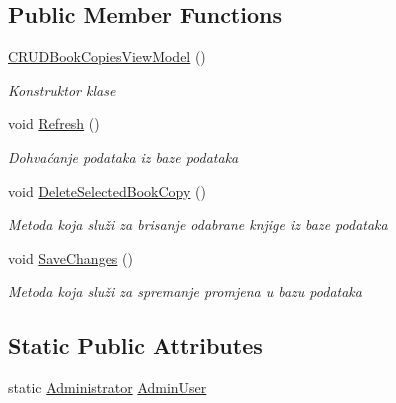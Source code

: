 \subsection*{Public Member Functions}
\begin{DoxyCompactItemize}
\item 
\mbox{\hyperlink{class_easy_library_application_1_1_w_p_f_1_1_view_model_1_1_c_r_u_d_book_copies_view_model_af97e6875ac18af67f3bf1a0243eceb86}{C\+R\+U\+D\+Book\+Copies\+View\+Model}} ()
\begin{DoxyCompactList}\small\item\em Konstruktor klase \end{DoxyCompactList}\item 
void \mbox{\hyperlink{class_easy_library_application_1_1_w_p_f_1_1_view_model_1_1_c_r_u_d_book_copies_view_model_ab1cf39d53fdb4af4a4ddd13f14a15278}{Refresh}} ()
\begin{DoxyCompactList}\small\item\em Dohvaćanje podataka iz baze podataka \end{DoxyCompactList}\item 
void \mbox{\hyperlink{class_easy_library_application_1_1_w_p_f_1_1_view_model_1_1_c_r_u_d_book_copies_view_model_a581924316d117e39c1a53b36e7a61290}{Delete\+Selected\+Book\+Copy}} ()
\begin{DoxyCompactList}\small\item\em Metoda koja služi za brisanje odabrane knjige iz baze podataka \end{DoxyCompactList}\item 
void \mbox{\hyperlink{class_easy_library_application_1_1_w_p_f_1_1_view_model_1_1_c_r_u_d_book_copies_view_model_a28e88009ab1d5f3c5dfd35a623b4a76a}{Save\+Changes}} ()
\begin{DoxyCompactList}\small\item\em Metoda koja služi za spremanje promjena u bazu podataka \end{DoxyCompactList}\end{DoxyCompactItemize}
\subsection*{Static Public Attributes}
\begin{DoxyCompactItemize}
\item 
static \mbox{\hyperlink{class_easy_library_application_1_1_w_p_f_1_1_model_1_1_administrator}{Administrator}} \mbox{\hyperlink{class_easy_library_application_1_1_w_p_f_1_1_view_model_1_1_c_r_u_d_book_copies_view_model_a2e8bc94a85f55ea3d38e4dd982ae60ab}{Admin\+User}}
\end{DoxyCompactItemize}
